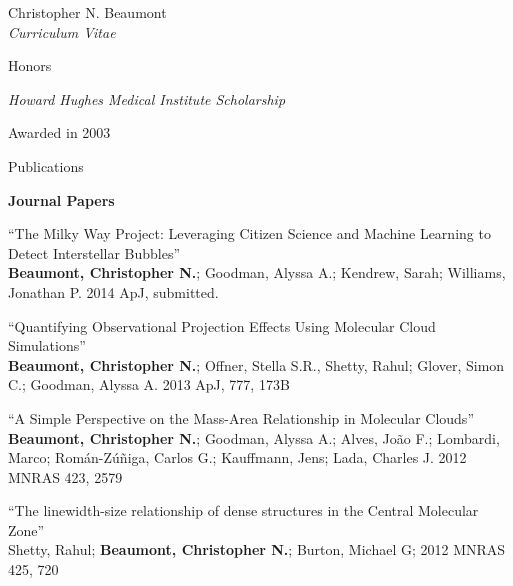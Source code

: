\documentclass[10pt]{article}
\newenvironment{sublist}{%
	\begin{list}{}{%
		\setlength{\itemsep}{0em}\setlength{\parsep}{0em}%
		\setlength{\topsep}{0em}\setlength{\parskip}{0em}%
	}%
}%
{ \end{list} }
\begin{document}
\begin{cv}{Christopher N. Beaumont\\{\large \itshape Curriculum Vitae}}
\begin{cvlist}{Honors}
\item
	\emph{Howard Hughes Medical Institute Scholarship}
	\begin{sublist}
	\item Awarded in 2003
	\end{sublist}

\end{cvlist}


\setlength{\oldcvlabelwidth}{\cvlabelwidth}
\setlength{\cvlabelwidth}{1em}
\renewcommand*{\bibindent}{1.5em}
\newcommand*{\biblabelsep}{1.5em}


\begin{cvlist}{Publications}
	\item \textbf{Journal Papers}
	\begin{sublist}
	\item ``The Milky Way Project: Leveraging Citizen Science and Machine Learning to Detect Interstellar Bubbles''\\
	\textbf{Beaumont, Christopher N.}; Goodman, Alyssa A.; Kendrew, Sarah; Williams, Jonathan P. 2014 ApJ, submitted. \\
	
	\item ``Quantifying Observational Projection Effects Using Molecular Cloud Simulations''\\
	\textbf{Beaumont, Christopher N.}; Offner, Stella S.R., Shetty, Rahul; Glover, Simon C.; Goodman, Alyssa A. 2013 ApJ, 777, 173B\\	
	\item ``A Simple Perspective on the Mass-Area Relationship in Molecular Clouds''\\
	\textbf{Beaumont, Christopher N.}; Goodman, Alyssa A.; Alves, Jo\~ao F.; Lombardi, Marco; Rom\'an-Z\'u\~niga, Carlos G.; Kauffmann, Jens; Lada, Charles J. 2012 MNRAS 423, 2579 \\
	
	\item ``The linewidth-size relationship of dense structures in the Central Molecular Zone''\\
	Shetty, Rahul; \textbf{Beaumont, Christopher N.}; Burton, Michael G; 2012 MNRAS 425, 720 \\
	

\end{sublist}
\end{cvlist}
\end{cv}
\end{document}
